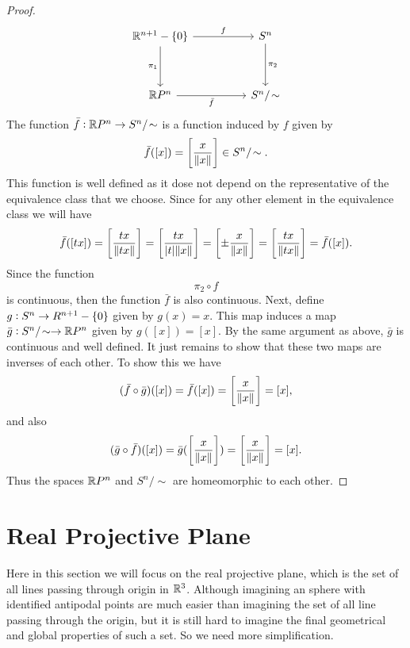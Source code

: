 \begin{proof}
	\[\begin{tikzcd}
		{\R^{n+1}-\{0\}} && {S^n} \\
		\\
		{\R P ^n} && {S^n/\sim}
		\arrow["f", from=1-1, to=1-3]
		\arrow["{\pi_1}"', from=1-1, to=3-1]
		\arrow["{\pi_2}", from=1-3, to=3-3]
		\arrow["{\bar{f}}"', from=3-1, to=3-3]
	\end{tikzcd}\]
	The function $ \bar{f}: \R P^n \to S^n/\sim $ is a function induced by $ f $ given by
	\[ \bar{f}([x]) = \left[\frac{x}{\norm{x}}\right] \in S^n/\sim. \]
	This function is well defined as it dose not depend on the representative of the equivalence class that we choose. Since for any other element in the equivalence class we will have
	\[ \bar{f}([tx]) = \left[ \frac{tx}{\norm{tx}} \right]=\left[ \frac{tx}{|t|\norm{x}} \right] = \left[ \pm \frac{x}{\norm{x}} \right] = \left[ \frac{tx}{\norm{tx}} \right]  = \bar{f}([x]).  \]
	Since the function \[ \pi_2\circ f \] is continuous, then the function $ \bar{f} $ is also continuous. Next, define $ g: S^n \to R^{n+1} - \{0\} $ given by $ g(x) = x $. This map induces a map $ \bar{g}: S^n/\sim \to \R P^n $ given by $ g([x]) = [x] $. By the same argument as above, $ \bar{g} $ is continuous and well defined. It just remains to show that these two maps are inverses of each other. To show this we have
	\[ (\bar{f}\circ\bar{g})([x]) = \bar{f}([x]) = \left[ \frac{x}{\norm{x}} \right]  = [x], \]
	and also 
	\[ (\bar{g}\circ\bar{f})([x]) = \bar{g}(\left[ \frac{x}{\norm{x}} \right]) = \left[ \frac{x}{\norm{x}} \right] = [x]. \]
	Thus the spaces $ \mathbb{R} P^n $ and $ S^n/\sim $ are homeomorphic to each other.
\end{proof}

\section{Real Projective Plane}
Here in this section we will focus on the real projective plane, which is the set of all lines passing through origin in $ \mathbb{R}^3 $. Although imagining an sphere with identified antipodal points are much easier than imagining the set of all line passing through the origin, but it is still hard to imagine the final geometrical and global properties of such a set. So we need more simplification.

